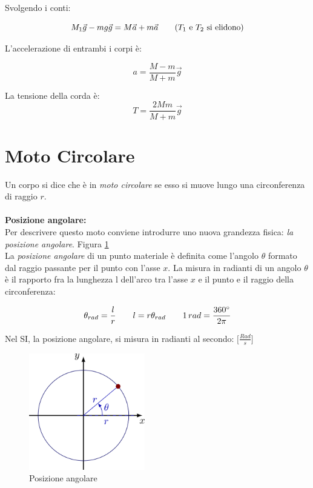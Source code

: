 Svolgendo i conti: 

\begin{equation*}
    M_1\vec{g} - mg\vec{g} = M\vec{a} + m\vec{a} \qquad \text{($T_1$ e $T_2$ si elidono)}
\end{equation*}

L'accelerazione di entrambi i corpi è:

\begin{equation}
    a = \frac{M-m}{M+m}\vec{g}
\end{equation}

La tensione della corda è:
\begin{equation}
    T = \frac{2 M m}{M+m}\vec{g}
\end{equation}


\newpage
\section{Moto Circolare}
Un corpo si dice che è in \textit{moto circolare} se esso si muove lungo una circonferenza di raggio $r$.

\paragraph{}
\textbf{Posizione angolare:}\\
Per descrivere questo moto conviene introdurre uno nuova grandezza fisica: \textit{la posizione angolare}. Figura \ref{fig:posizAng} \\
La \textit{posizione angolare} di un punto materiale è definita come l’angolo $\theta$ formato dal raggio passante per il punto con l’asse $x$.
La misura in radianti di un angolo $\theta$ è il rapporto fra la lunghezza l dell'arco tra l'asse $x$ e il punto e il raggio della circonferenza:

\begin{equation*}
    \theta_{rad} = \frac{l}{r} \qquad l=r\theta_{rad} \qquad 1\,rad = \frac{360^\circ}{2\pi}
\end{equation*} 

Nel SI, la posizione angolare, si misura in radianti al secondo: $\bigl[\frac{Rad}{s}\bigl]$

\begin{figure}[tb]
    \centering
    \includegraphics[width=0.45\textwidth]{image/posizioneAngolare.png}
    \caption{Posizione angolare}
    \label{fig:posizAng}
\end{figure}

